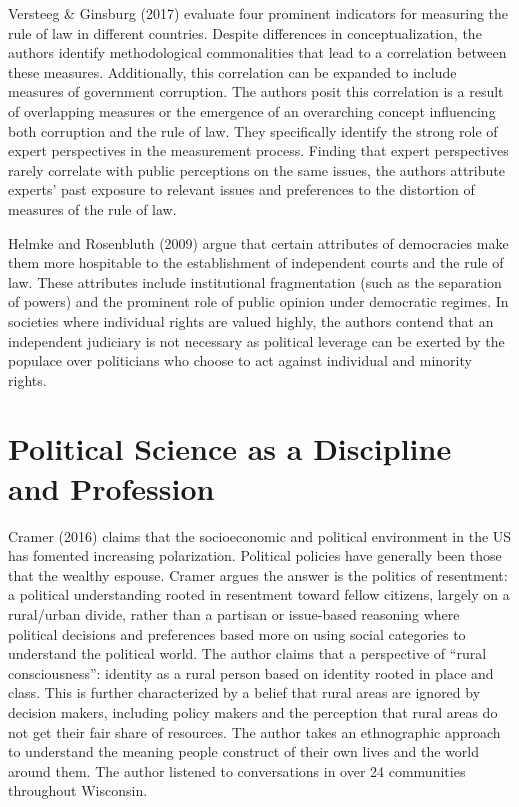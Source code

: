 \documentclass[
  english,
  man]{article}
\begin{document}
Versteeg \& Ginsburg (2017) evaluate four prominent indicators for measuring the rule of law in different countries. Despite differences in conceptualization, the authors identify methodological commonalities that lead to a correlation between these measures. Additionally, this correlation can be expanded to include measures of government corruption. The authors posit this correlation is a result of overlapping measures or the emergence of an overarching concept influencing both corruption and the rule of law. They specifically identify the strong role of expert perspectives in the measurement process. Finding that expert perspectives rarely correlate with public perceptions on the same issues, the authors attribute experts' past exposure to relevant issues and preferences to the distortion of measures of the rule of law.

Helmke and Rosenbluth (2009) argue that certain attributes of democracies make them more hospitable to the establishment of independent courts and the rule of law. These attributes include institutional fragmentation (such as the separation of powers) and the prominent role of public opinion under democratic regimes. In societies where individual rights are valued highly, the authors contend that an independent judiciary is not necessary as political leverage can be exerted by the populace over politicians who choose to act against individual and minority rights.

\hypertarget{political-science-as-a-discipline-and-profession}{%
\section{Political Science as a Discipline and Profession}\label{political-science-as-a-discipline-and-profession}}

Cramer (2016) claims that the socioeconomic and political environment in the US has fomented increasing polarization. Political policies have generally been those that the wealthy espouse. Cramer argues the answer is the politics of resentment: a political understanding rooted in resentment toward fellow citizens, largely on a rural/urban divide, rather than a partisan or issue-based reasoning where political decisions and preferences based more on using social categories to understand the political world. The author claims that a perspective of \enquote{rural consciousness}: identity as a rural person based on identity rooted in place and class. This is further characterized by a belief that rural areas are ignored by decision makers, including policy makers and the perception that rural areas do not get their fair share of resources. The author takes an ethnographic approach to understand the meaning people construct of their own lives and the world around them. The author listened to conversations in over 24 communities throughout Wisconsin.
\end{document}
